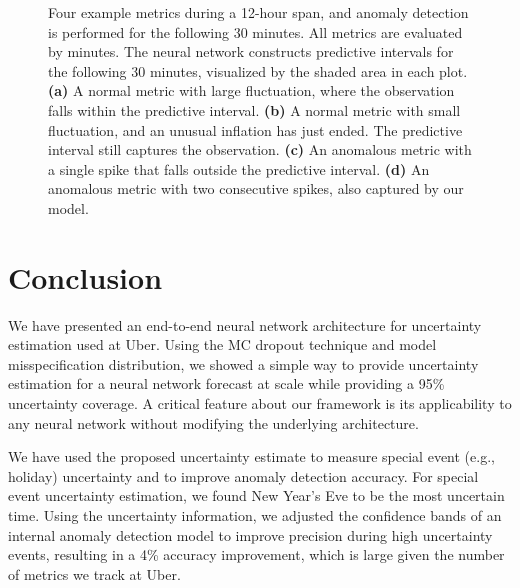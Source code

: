 \documentclass[conference,compsoc,final]{IEEEtran}
\begin{document}
\begin{figure}[!t]
\centering
{}


\caption{Four example metrics during a 12-hour span, and anomaly detection is performed for the following 30 minutes. All metrics are evaluated by minutes. The neural network constructs predictive intervals for the following 30 minutes, visualized by the shaded area in each plot. 
{\bf (a)} A normal metric with large fluctuation, where the observation falls within the predictive interval.
{\bf (b)} A normal metric with small fluctuation, and an unusual inflation has just ended. The predictive interval still captures the observation.
{\bf (c)} An anomalous metric with a single spike that falls outside the predictive interval.
{\bf (d)} An anomalous metric with two consecutive spikes, also captured by our model.
}
\label{fig:anomaly}
\end{figure}











 

\section{Conclusion}
\label{sec:conclusion}

We have presented an end-to-end neural network architecture for uncertainty estimation used 
at Uber. 
Using the MC dropout technique and model misspecification distribution, we showed a simple way to provide uncertainty estimation for a neural network forecast at scale while providing a 95\% uncertainty coverage. A critical feature about our framework is its applicability to any neural network without modifying the underlying architecture.

We have used the proposed uncertainty estimate to measure special event (e.g., holiday) uncertainty and to improve anomaly detection accuracy. For special event uncertainty estimation, we found New Year's Eve to be the most uncertain time. Using the uncertainty information, we adjusted the confidence bands of an internal anomaly detection model to improve precision during high uncertainty events, resulting in a 4\% accuracy improvement, which is large given the number of metrics we track 
at Uber. 
\end{document}
